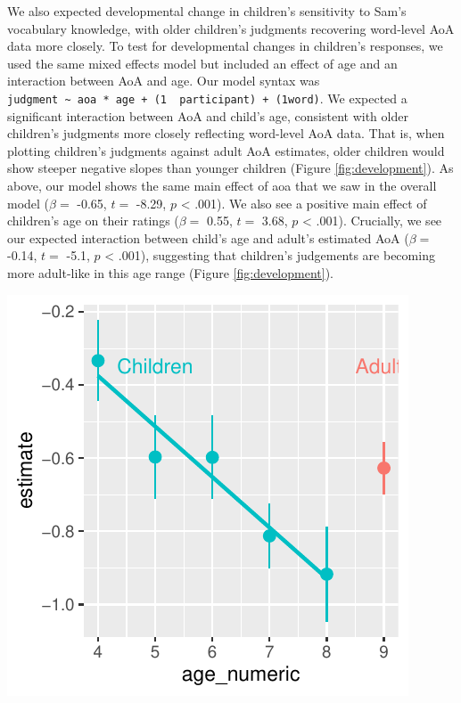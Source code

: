 \documentclass[10pt, letterpaper]{article}
\newenvironment{CodeChunk}{}{}
\begin{document}
We also expected developmental change in children's sensitivity to Sam's
vocabulary knowledge, with older children's judgments recovering
word-level AoA data more closely. To test for developmental changes in
children's responses, we used the same mixed effects model but included
an effect of age and an interaction between AoA and age. Our model
syntax was
\texttt{judgment\ \textasciitilde{}\ aoa\ *\ age\ +\ (1\ \textbar{}\ participant)\ +\ (1\textbar{}word)}.
We expected a significant interaction between AoA and child's age,
consistent with older children's judgments more closely reflecting
word-level AoA data. That is, when plotting children's judgments against
adult AoA estimates, older children would show steeper negative slopes
than younger children (Figure \ref{fig:development}). As above, our
model shows the same main effect of aoa that we saw in the overall model
(\(\beta =\) -0.65, \(t =\) -8.29, \(p\) \textless{} .001). We also see
a positive main effect of children's age on their ratings (\(\beta =\)
0.55, \(t =\) 3.68, \(p\) \textless{} .001). Crucially, we see our
expected interaction between child's age and adult's estimated AoA
(\(\beta =\) -0.14, \(t =\) -5.1, \(p\) \textless{} .001), suggesting
that children's judgements are becoming more adult-like in this age
range (Figure \ref{fig:development}).

\begin{CodeChunk}

\includegraphics{figs/unnamed-chunk-6-1} \end{CodeChunk}
\end{document}
